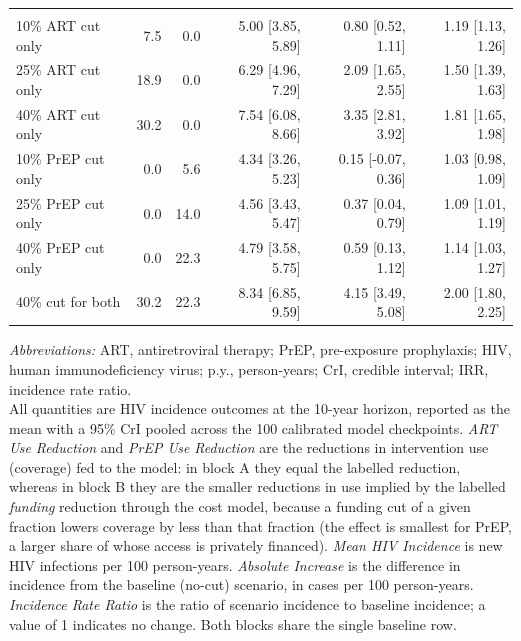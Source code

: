 \begin{landscape}
\begin{table}[!h]
{\begin{tabular}[t]{lrrrrr}
\addlinespace[0.6em]
\multicolumn{6}{l}{\textbf{B. Government funding reduction}}\\
\hspace{1em}10\% ART cut only & 7.5 & 0.0 & \phantom{0}5.00 [3.85, \phantom{0}5.89] & 0.80 [\phantom{-}0.52, 1.11] & 1.19 [1.13, 1.26]\\
\hspace{1em}25\% ART cut only & 18.9 & 0.0 & \phantom{0}6.29 [4.96, \phantom{0}7.29] & 2.09 [\phantom{-}1.65, 2.55] & 1.50 [1.39, 1.63]\\
\hspace{1em}40\% ART cut only & 30.2 & 0.0 & \phantom{0}7.54 [6.08, \phantom{0}8.66] & 3.35 [\phantom{-}2.81, 3.92] & 1.81 [1.65, 1.98]\\
\hspace{1em}10\% PrEP cut only & 0.0 & 5.6 & \phantom{0}4.34 [3.26, \phantom{0}5.23] & 0.15 [-0.07, 0.36] & 1.03 [0.98, 1.09]\\
\hspace{1em}25\% PrEP cut only & 0.0 & 14.0 & \phantom{0}4.56 [3.43, \phantom{0}5.47] & 0.37 [\phantom{-}0.04, 0.79] & 1.09 [1.01, 1.19]\\
\hspace{1em}40\% PrEP cut only & 0.0 & 22.3 & \phantom{0}4.79 [3.58, \phantom{0}5.75] & 0.59 [\phantom{-}0.13, 1.12] & 1.14 [1.03, 1.27]\\
\hspace{1em}40\% cut for both & 30.2 & 22.3 & \phantom{0}8.34 [6.85, \phantom{0}9.59] & 4.15 [\phantom{-}3.49, 5.08] & 2.00 [1.80, 2.25]\\
\bottomrule
\end{tabular}}
\vspace{0.4em}
{\footnotesize\begin{minipage}{\linewidth}
\emph{Abbreviations:} ART, antiretroviral therapy; PrEP, pre-exposure prophylaxis; HIV, human immunodeficiency virus; p.y., person-years; CrI, credible interval; IRR, incidence rate ratio.\\[0.3em]
All quantities are HIV incidence outcomes at the 10-year horizon, reported as the mean with a 95\% CrI pooled across the 100 calibrated model checkpoints. \emph{ART Use Reduction} and \emph{PrEP Use Reduction} are the reductions in intervention use (coverage) fed to the model: in block A they equal the labelled reduction, whereas in block B they are the smaller reductions in use implied by the labelled \emph{funding} reduction through the cost model, because a funding cut of a given fraction lowers coverage by less than that fraction (the effect is smallest for PrEP, a larger share of whose access is privately financed). \emph{Mean HIV Incidence} is new HIV infections per 100 person-years. \emph{Absolute Increase} is the difference in incidence from the baseline (no-cut) scenario, in cases per 100 person-years. \emph{Incidence Rate Ratio} is the ratio of scenario incidence to baseline incidence; a value of 1 indicates no change. Both blocks share the single baseline row.
\end{minipage}}
\end{table}
\end{landscape}
